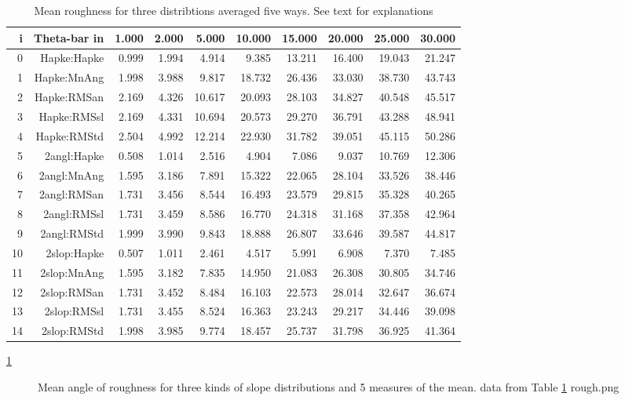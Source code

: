 \documentclass{article}
\begin{document}
\begin{table}
\caption[Mean Roughness]{Mean roughness for three distribtions averaged five ways. See text for explanations   }
\label{tab:ruf}
\begin{center}
\begin{tabular}{ | r r r r r r r r r r | } \hline
i & Theta-bar in & 1.000 & 2.000 & 5.000 & 10.000 & 15.000 & 20.000 & 25.000 & 30.000 \\ \hline
0 & Hapke:Hapke & 0.999 & 1.994 & 4.914 & 9.385 & 13.211 & 16.400 & 19.043 & 21.247 \\
1 & Hapke:MnAng & 1.998 & 3.988 & 9.817 & 18.732 & 26.436 & 33.030 & 38.730 & 43.743 \\
2 & Hapke:RMSan & 2.169 & 4.326 & 10.617 & 20.093 & 28.103 & 34.827 & 40.548 & 45.517 \\
3 & Hapke:RMSsl & 2.169 & 4.331 & 10.694 & 20.573 & 29.270 & 36.791 & 43.288 & 48.941 \\
4 & Hapke:RMStd & 2.504 & 4.992 & 12.214 & 22.930 & 31.782 & 39.051 & 45.115 & 50.286 \\
5 & 2angl:Hapke & 0.508 & 1.014 & 2.516 & 4.904 & 7.086 & 9.037 & 10.769 & 12.306 \\
6 & 2angl:MnAng & 1.595 & 3.186 & 7.891 & 15.322 & 22.065 & 28.104 & 33.526 & 38.446 \\
7 & 2angl:RMSan & 1.731 & 3.456 & 8.544 & 16.493 & 23.579 & 29.815 & 35.328 & 40.265 \\
8 & 2angl:RMSsl & 1.731 & 3.459 & 8.586 & 16.770 & 24.318 & 31.168 & 37.358 & 42.964 \\
9 & 2angl:RMStd & 1.999 & 3.990 & 9.843 & 18.888 & 26.807 & 33.646 & 39.587 & 44.817 \\
10 & 2slop:Hapke & 0.507 & 1.011 & 2.461 & 4.517 & 5.991 & 6.908 & 7.370 & 7.485 \\
11 & 2slop:MnAng & 1.595 & 3.182 & 7.835 & 14.950 & 21.083 & 26.308 & 30.805 & 34.746 \\
12 & 2slop:RMSan & 1.731 & 3.452 & 8.484 & 16.103 & 22.573 & 28.014 & 32.647 & 36.674 \\
13 & 2slop:RMSsl & 1.731 & 3.455 & 8.524 & 16.363 & 23.243 & 29.217 & 34.446 & 39.098 \\
14 & 2slop:RMStd & 1.998 & 3.985 & 9.774 & 18.457 & 25.737 & 31.798 & 36.925 & 41.364 \\
 \hline
\end{tabular} \end{center} \end{table}


\ref{rough}
\begin{figure}[!ht] 
\caption[Roughness models]{Mean angle of roughness for three kinds of slope distributions and 5 measures of the mean. data from Table \ref{tab:ruf}
\label{rough} rough.png  }
\end{figure} 

\end{document}
